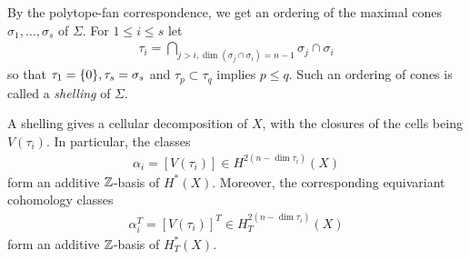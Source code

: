 By the polytope-fan correspondence,
we get an ordering of the maximal cones $\sigma_1,\ldots,\sigma_s$ of $\Sigma$.
For $1\leq i \leq s$ let \begin{align*}
	\tau_i = \bigcap_{j>i, \dim(\sigma_j \cap \sigma_i) = n-1} \sigma_j \cap \sigma_i
\end{align*} so that
$\tau_1 = \{0\}, \tau_s = \sigma_s$ and $\tau_p \subset \tau_q$
implies $p \leq q$. Such an ordering of cones
is called a \emph{shelling} of $\Sigma$.

\begin{proposition}
	A shelling gives a cellular decomposition of $X$, with
	the closures of the cells being $V(\tau_i)$. In particular,
	the classes \begin{align*}
		\alpha_i = [V(\tau_i)] \in H^{2(n-\dim \tau_i)}(X)
	\end{align*}
	form an additive $\mathbb{Z}$-basis of $H^*(X)$. Moreover, the
	corresponding equivariant cohomology classes \begin{align*}
		\alpha_i^T = [V(\tau_i)]^T \in H^{2(n-\dim \tau_i)}_T(X)
	\end{align*} form an additive $\mathbb{Z}$-basis of $H^*_T(X)$.
\end{proposition}


